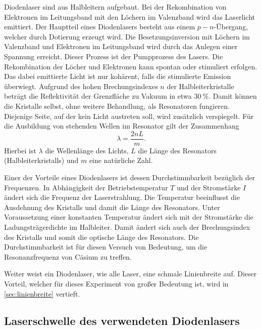 \documentclass[../bericht.tex]{subfiles}
\begin{document}
      Diodenlaser sind aus Halbleitern aufgebaut. Bei der Rekombination von Elektronen im Leitungsband mit den L\"ochern im Valenzband wird das Laserlicht emittiert. Der Hauptteil eines Diodenlasers besteht aus einem $p-n$-\"Ubergang, welcher durch Dotierung erzeugt wird. Die Besetzungsinversion mit L\"ochern im Valenzband und Elektronen im Leitungsband wird durch das Anlegen einer Spannung erreicht. Dieser Prozess ist der Pumpprozess des Lasers. Die Rekombination der L\"ocher und Elektronen kann spontan oder stimuliert erfolgen. Das dabei emittierte Licht ist nur koh\"arent, falls die stimulierte Emission \"uberwiegt. Aufgrund des hohen Brechungsindexes $n$ der Halbleiterkristalle betr\"agt die Reflektivit\"at der Grenzfl\"ache zu Vakuum in etwa $\SI{30}{\percent}$. Damit k\"onnen die Kristalle selbst, ohne weitere Behandlung, als Resonatoren fungieren. Diejenige Seite, auf der kein Licht austreten soll, wird zus\"atzlich verspiegelt. F\"ur die Ausbildung von stehenden Wellen im Resonator gilt der Zusammenhang
      \begin{equation*}
        \lambda = \frac{2nL}{m}.
      \end{equation*}
      Hierbei ist $\lambda$ die Wellenl\"ange des Lichts, $L$ die L\"ange des Resonators (Halbleiterkristalls) und $m$ eine nat\"urliche Zahl.

      Einer der Vorteile eines Diodenlasers ist dessen Durchstimmbarkeit bez\"uglich der Frequenzen. In Abh\"angigkeit der Betriebstemperatur $T$ und der Stromst\"arke $I$ \"andert sich die Frequenz der Laserstrahlung. Die Temperatur beeinflusst die Ausdehnung des Kristalls und damit die L\"ange des Resonators. Unter Voraussetzung einer konstanten Temperatur \"andert sich mit der Stromst\"arke die Ladungstr\"agerdichte im Halbleiter. Damit \"andert sich auch der Brechungsindex des Kristalls und somit die optische L\"ange des Resonators.
      Die Durchstimmbarkeit ist f\"ur diesen Versuch von Bedeutung, um die Resonanzfrequenz von C\"asium zu treffen.
      \medskip

      Weiter weist ein Diodenlaser, wie alle Laser, eine schmale Linienbreite auf. Dieser Vorteil, welcher f\"ur dieses Experiment von gro\ss{}er Bedeutung ist, wird in \cref{sec:linienbreite} vertieft.


      \subsection{Laserschwelle des verwendeten Diodenlasers}
      \label{subsec:laserschwelle}
\end{document}

